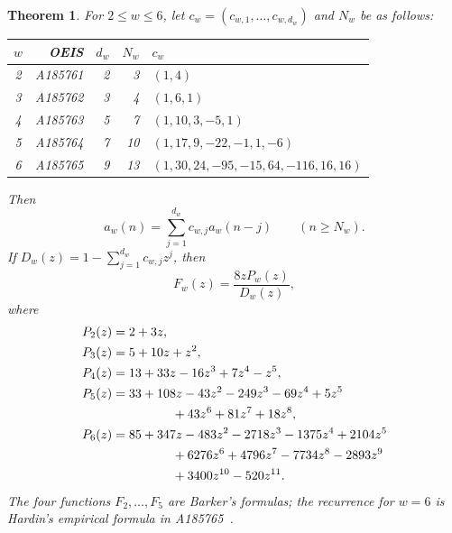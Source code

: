 \documentclass[11pt]{article}
\newtheorem{theorem}{Theorem}
\begin{document}
\begin{theorem}\label{thm:main}
For $2\le w\le6$, let $c_w=(c_{w,1},\ldots,c_{w,d_w})$ and $N_w$ be
as follows:
\begin{center}
\begin{tabular}{crrrl}
\toprule
$w$&OEIS&$d_w$&$N_w$&$c_w$\\
\midrule
2&A185761&2&3&$(1,4)$\\
3&A185762&3&4&$(1,6,1)$\\
4&A185763&5&7&$(1,10,3,-5,1)$\\
5&A185764&7&10&$(1,17,9,-22,-1,1,-6)$\\
6&A185765&9&13&$(1,30,24,-95,-15,64,-116,16,16)$\\
\bottomrule
\end{tabular}
\end{center}
Then
\begin{equation}\label{eq:rec}
 a_w(n)=\sum_{j=1}^{d_w}c_{w,j}a_w(n-j)\qquad(n\ge N_w).
\end{equation}
If $D_w(z)=1-\sum_{j=1}^{d_w}c_{w,j}z^j$, then
\begin{equation}\label{eq:gf}
 F_w(z)=\frac{8zP_w(z)}{D_w(z)},
\end{equation}
where
\begin{align*}
P_2(z)={}&2+3z,\\
P_3(z)={}&5+10z+z^2,\\
P_4(z)={}&13+33z-16z^3+7z^4-z^5,\\
P_5(z)={}&33+108z-43z^2-249z^3-69z^4+5z^5\\
 &\hspace{12mm}+43z^6+81z^7+18z^8,\\
P_6(z)={}&85+347z-483z^2-2718z^3-1375z^4+2104z^5\\
 &\hspace{12mm}+6276z^6+4796z^7-7734z^8-2893z^9\\
 &\hspace{12mm}+3400z^{10}-520z^{11}.
\end{align*}
The four functions $F_2,\ldots,F_5$ are Barker's formulas; the recurrence for
$w=6$ is Hardin's empirical formula in A185765~\cite{oeis6}.
\end{theorem}
\end{document}

